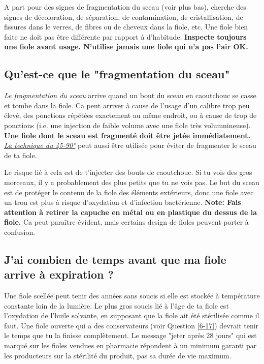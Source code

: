 \documentclass{article}
\begin{document}
A part pour des signes de fragmentation du sceau (voir plus bas), cherche des signes de décoloration, de séparation, de contamination, de cristallisation, de fissures dans le verres, de fibres ou de cheveux dans la fiole, etc. Une fiole bien faite ne doit pas être différente par rapport à d'habitude. \textbf{Inspecte toujours une fiole avant usage. N'utilise jamais une fiole qui n'a pas l'air OK.} 

\subsection{Qu'est-ce que le "fragmentation du sceau"}\label{5-23}

\textit{Le fragmentation du sceau} arrive quand un bout du sceau en caoutchouc se casse et tombe dans la fiole. Ca peut arriver à cause de l'usage d'un calibre trop peu élevé, des ponctions répétées exactement au même endroit, ou à cause de trop de ponctions (i.e. une injection de faible volume avec une fiole très volumnineuse). \textbf{Une fiole dont le sceau est fragmenté doit être jetée immédiatement.} \href{https://www.youtube.com/watch?v=w5F0SLoMjC8}{\textit{La technique du 45-90°}} peut aussi être utilisée pour éviter de fragmenter le sceau de ta fiole.

Le risque lié à cela est de t'injecter des bouts de caoutchouc. Si tu vois des gros morceaux, il y a probablement des plus petits que tu ne vois pas. Le but du sceau est de protéger le contenu de la fiole des éléments extérieurs, donc une fiole avec un trou est plus à risque d'oxydation et d'infection bactérienne. \textbf{Note: Fais attention à retirer la capuche en métal ou en plastique du dessus de la fiole.} Ca peut paraître évident, mais certains design de fioles peuvent porter à confusion.

\subsection{J'ai combien de temps avant que ma fiole arrive à expiration ?}

Une fiole scellée peut tenir des années sans soucis si elle est stockée à température constante loin de la lumière. Le plus gros soucis lié à l'âge de ta fiole est l'oxydation de l'huile solvante, en supposant que la fiole ait été stérilisée comme il faut. Une fiole ouverte qui a des conservateurs (voir Question \ref{6-17}) devrait tenir le temps que tu la finisse complètement. Le message "jeter après 28 jours" qui est marqué sur les fioles vendues en pharmacie répondent à un minimum garanti par les producteurs sur la stérilité du produit, pas sa durée de vie maximum.
\end{document}
